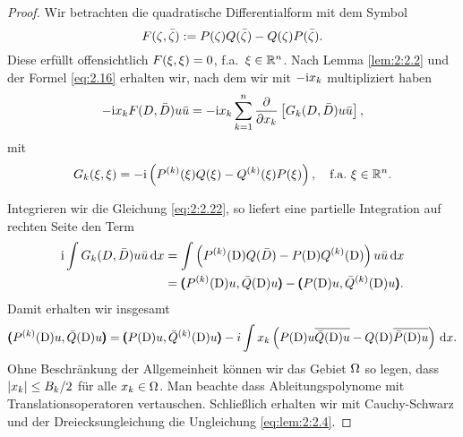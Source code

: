 \begin{proof}
Wir betrachten die quadratische Differentialform mit dem Symbol
\begin{equation}
F(\zeta,\bar{\zeta}):=P(\zeta)Q(\bar{\zeta})-Q(\zeta)P(\bar{\zeta}).
\end{equation}
Diese erfüllt offensichtlich $F(\xi,\xi)=0$, f.a.~$\xi\in\mathbb R^n$.
Nach Lemma \ref{lem:2:2.2} und der Formel \eqref{eq:2.16}
erhalten wir, nach dem wir mit $-\mathrm i x_k$ multipliziert haben
\begin{equation}\label{eq:2:2.22}
-\mathrm i x_kF(D,\bar{D})u\bar{u}=-\mathrm i x_k\sum_{k=1}^n\frac{\partial}{\partial x_k}\left[G_k(D,\bar{D})u\bar{u}\right],
\end{equation}
mit
\begin{equation}
G_k(\xi,\xi)=-\mathrm i\left(P^{(k)}(\xi)Q(\xi)-Q^{(k)}(\xi)P(\xi)\right),
\quad\text{f.a.}~\xi\in\mathbb R^n.
\end{equation}

Integrieren wir die Gleichung \eqref{eq:2:2.22},
so liefert eine partielle Integration auf rechten Seite den Term
\begin{align}
\mathrm i\int G_k(D,\bar{D})u\bar{u}\,\mathrm d x&=\int\left(P^{(k)}(\mathrm D)Q(\bar{D})-P(\mathrm D)Q^{(k)}(\mathrm D)\right)u\bar{u}\,\mathrm d x\\
&=\pmb(P^{(k)}(\mathrm D)u,\bar{Q}(\mathrm D)u\pmb)-\pmb(P(\mathrm D)u,\bar{Q}^{(k)}(\mathrm D)u\pmb).
\end{align}
Damit erhalten wir insgesamt
\begin{equation}
\pmb(P^{(k)}(\mathrm D)u,\bar{Q}(\mathrm D)u\pmb)
=\pmb(P(\mathrm D)u,\bar{Q}^{(k)}(\mathrm D)u\pmb)-i\int x_k\left(P(\mathrm D)u\overline{\bar{Q}(\mathrm D)u}-Q(\mathrm D)\overline{\bar{P}(\mathrm D)u}\right)\,\mathrm d x.
\end{equation}
Ohne Beschränkung der Allgemeinheit können wir das Gebiet $\Omega$ so legen,
dass $\lvert x_k\rvert\leq B_k/2$ für alle $x_k\in\Omega$.
Man beachte dass Ableitungspolynome mit Translationsoperatoren vertauschen.
Schließlich erhalten wir mit Cauchy-Schwarz
und der Dreiecksungleichung die Ungleichung \eqref{eq:lem:2:2.4}.
\end{proof}

